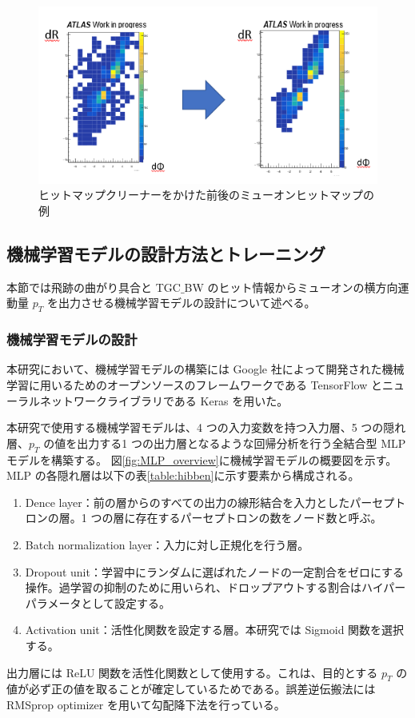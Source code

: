 \begin{figure}[tb]
  \centering
  \includegraphics[clip, width=14cm]{fig/4/cleaner.png}
  \caption{ヒットマップクリーナーをかけた前後のミューオンヒットマップの例}
  \label{fig:hitmapcleaner}
\end{figure}


\subsection{機械学習モデルの設計方法とトレーニング}
本節では飛跡の曲がり具合と TGC$\_$BW のヒット情報からミューオンの横方向運動量 $p_T$ を出力させる機械学習モデルの設計について述べる。

\subsubsection{機械学習モデルの設計}

本研究において、機械学習モデルの構築には Google 社によって開発された機械学習に用いるためのオープンソースのフレームワークである TensorFlow \cite{article:TensorFlow}とニューラルネットワークライブラリである Keras \cite{article:keras}を用いた。

本研究で使用する機械学習モデルは、4 つの入力変数を持つ入力層、5 つの隠れ層、$p_T$ の値を出力する1 つの出力層となるような回帰分析を行う全結合型 MLP モデルを構築する。
図\ref{fig:MLP_overview}に機械学習モデルの概要図を示す。
MLP の各隠れ層は以下の表\ref{table:hibben}に示す要素から構成される。
\begin{enumerate}\label{table:hibben}
   \item Dence layer：前の層からのすべての出力の線形結合を入力としたパーセプトロンの層。1 つの層に存在するパーセプトロンの数をノード数と呼ぶ。
   \item Batch normalization layer：入力に対し正規化を行う層。
   \item Dropout unit：学習中にランダムに選ばれたノードの一定割合をゼロにする操作。過学習の抑制のために用いられ、ドロップアウトする割合はハイパーパラメータとして設定する。
   \item Activation unit：活性化関数を設定する層。本研究では Sigmoid 関数を選択する。
\end{enumerate}
出力層には ReLU 関数を活性化関数として使用する。これは、目的とする $p_T$ の値が必ず正の値を取ることが確定しているためである。誤差逆伝搬法には RMSprop optimizer を用いて勾配降下法を行っている。

